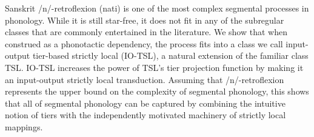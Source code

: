 Sanskrit /n/-retroflexion (nati) is one of the most complex segmental processes in phonology. While it is still star-free, it does not fit in any of the subregular classes that are commonly entertained in the literature. We show that when construed as a phonotactic dependency, the process fits into a class we call input-output tier-based strictly local (IO-TSL), a natural extension of the familiar class TSL. IO-TSL increases the power of TSL's tier projection function by making it an input-output strictly local transduction. Assuming that /n/-retroflexion represents the upper bound on the complexity of segmental phonology, this shows that all of segmental phonology can be captured by combining the intuitive notion of tiers with the independently motivated machinery of strictly local mappings.

